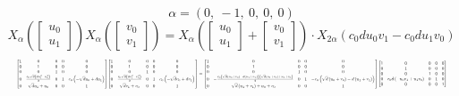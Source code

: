 \documentclass[11pt]{article}
\theoremstyle{definition}
\begin{document}
\[
\alpha = \left( 0, \  -1, \  0, \  0, \  0\right)
\]
\[
X_{\alpha}\left(\left[\begin{matrix}u_{0}\\u_{1}\end{matrix}\right]\right) X_{\alpha}\left(\left[\begin{matrix}v_{0}\\v_{1}\end{matrix}\right]\right) = X_{\alpha}\left(\left[\begin{matrix}u_{0}\\u_{1}\end{matrix}\right] + \left[\begin{matrix}v_{0}\\v_{1}\end{matrix}\right]\right) \cdot X_{2\alpha}\left(c_{0} d u_{0} v_{1} - c_{0} d u_{1} v_{0}\right)
\]
\[
\resizebox{\textwidth}{!}{${\left[\begin{matrix}1 & 0 & 0 & 0 & 0\\0 & 1 & 0 & 0 & 0\\0 & 0 & 1 & 0 & 0\\0 & \frac{c_{0} \sqrt{d} \left(d u_{1}^{2} - u_{0}^{2}\right)}{2} & 0 & 1 & c_{0} \left(- \sqrt{d} u_{0} + d u_{1}\right)\\0 & \sqrt{d} u_{1} + u_{0} & 0 & 0 & 1\end{matrix}\right]} {\left[\begin{matrix}1 & 0 & 0 & 0 & 0\\0 & 1 & 0 & 0 & 0\\0 & 0 & 1 & 0 & 0\\0 & \frac{c_{0} \sqrt{d} \left(d v_{1}^{2} - v_{0}^{2}\right)}{2} & 0 & 1 & c_{0} \left(- \sqrt{d} v_{0} + d v_{1}\right)\\0 & \sqrt{d} v_{1} + v_{0} & 0 & 0 & 1\end{matrix}\right]} = {\left[\begin{matrix}1 & 0 & 0 & 0 & 0\\0 & 1 & 0 & 0 & 0\\0 & 0 & 1 & 0 & 0\\0 & - \frac{c_{0} \left(\sqrt{d} \left(u_{0} + v_{0}\right) - d \left(u_{1} + v_{1}\right)\right) \left(\sqrt{d} \left(u_{1} + v_{1}\right) + u_{0} + v_{0}\right)}{2} & 0 & 1 & - c_{0} \left(\sqrt{d} \left(u_{0} + v_{0}\right) - d \left(u_{1} + v_{1}\right)\right)\\0 & \sqrt{d} \left(u_{1} + v_{1}\right) + u_{0} + v_{0} & 0 & 0 & 1\end{matrix}\right]} {\left[\begin{matrix}1 & 0 & 0 & 0 & 0\\0 & 1 & 0 & 0 & 0\\0 & 0 & 1 & 0 & 0\\0 & c_{0} d \left(- u_{0} v_{1} + u_{1} v_{0}\right) & 0 & 1 & 0\\0 & 0 & 0 & 0 & 1\end{matrix}\right]}$}
\]
\end{document}
